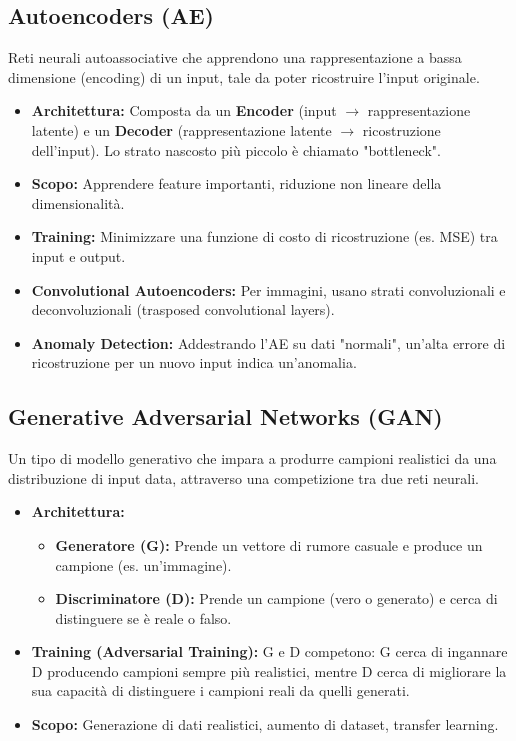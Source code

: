 \documentclass[a4paper,11pt]{article}
\begin{document}
\subsection{Autoencoders (AE)}
Reti neurali autoassociative che apprendono una rappresentazione a bassa dimensione (encoding) di un input, tale da poter ricostruire l'input originale.
\begin{itemize}
    \item \textbf{Architettura:} Composta da un \textbf{Encoder} (input $\to$ rappresentazione latente) e un \textbf{Decoder} (rappresentazione latente $\to$ ricostruzione dell'input). Lo strato nascosto più piccolo è chiamato "bottleneck".
    \item \textbf{Scopo:} Apprendere feature importanti, riduzione non lineare della dimensionalità.
    \item \textbf{Training:} Minimizzare una funzione di costo di ricostruzione (es. MSE) tra input e output.
    \item \textbf{Convolutional Autoencoders:} Per immagini, usano strati convoluzionali e deconvoluzionali (trasposed convolutional layers).
    \item \textbf{Anomaly Detection:} Addestrando l'AE su dati "normali", un'alta errore di ricostruzione per un nuovo input indica un'anomalia.
\end{itemize}

\subsection{Generative Adversarial Networks (GAN)}
Un tipo di modello generativo che impara a produrre campioni realistici da una distribuzione di input data, attraverso una competizione tra due reti neurali.
\begin{itemize}
    \item \textbf{Architettura:}
    \begin{itemize}
        \item \textbf{Generatore (G):} Prende un vettore di rumore casuale e produce un campione (es. un'immagine).
        \item \textbf{Discriminatore (D):} Prende un campione (vero o generato) e cerca di distinguere se è reale o falso.
    \end{itemize}
    \item \textbf{Training (Adversarial Training):} G e D competono: G cerca di ingannare D producendo campioni sempre più realistici, mentre D cerca di migliorare la sua capacità di distinguere i campioni reali da quelli generati.
    \item \textbf{Scopo:} Generazione di dati realistici, aumento di dataset, transfer learning.
\end{itemize}
\end{document}
